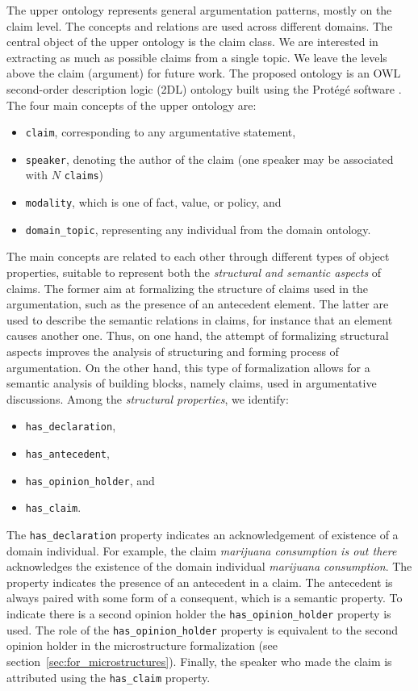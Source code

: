 The upper ontology represents general argumentation patterns, mostly on the
claim level.  The concepts and relations are used across different domains.
The central object of the upper ontology is the claim class. We are interested
in extracting as much as possible claims from a single topic. We leave the
levels above the claim (argument) for future work. The proposed ontology is an
OWL second-order description logic (2DL) ontology built using the
Prot\'{e}g\'{e} software \citep{gennari2003evolution}. The four main concepts
of the upper ontology are:
\begin{itemize}
	\item \texttt{claim}, corresponding to any argumentative statement,
	\item \texttt{speaker},  denoting the author of the claim
		(one speaker may be associated with $N$ \texttt{claims})
	\item \texttt{modality}, which is one of fact, value, or policy, and
	\item \texttt{domain\_topic}, representing any individual from the domain ontology.
\end{itemize}

The main concepts are related to each other through different types of object
properties, suitable to represent both the \emph{structural and semantic aspects} of
claims. The former aim at formalizing the structure of claims used in
the argumentation, such as the presence of an antecedent element. The latter
are used to describe the semantic relations in claims, for instance that
an element causes another one. Thus, on one hand, the attempt of 
formalizing structural aspects improves the analysis of structuring and
forming process of argumentation. On the other hand, this type of formalization
allows for a semantic analysis of building blocks, namely claims, used in 
argumentative discussions. Among the \emph{structural properties}, we identify:
\begin{itemize}
\item \texttt{has\_declaration}, 
\item \texttt{has\_antecedent},
\item \texttt{has\_opinion\_holder}, and
\item \texttt{has\_claim}. 
\end{itemize}
The \texttt{has\_declaration} property indicates an acknowledgement of
existence of a domain individual. For example, the claim 
\emph{marijuana consumption is out there} acknowledges
the existence of the domain individual \emph{marijuana consumption}.
The  property indicates the presence of an 
antecedent in a claim. The antecedent is always paired with some
form of a consequent, which is a semantic property. To indicate
there is a second opinion holder the \texttt{has\_opinion\_holder}
property is used. The role of the \texttt{has\_opinion\_holder}
property is equivalent to the second opinion holder in the microstructure
formalization (see section~\ref{sec:for_microstructures}). Finally, the speaker
who made the claim is attributed using the \texttt{has\_claim} property.

